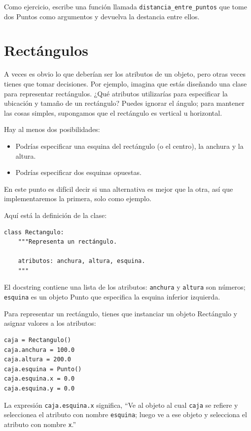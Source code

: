 \documentclass[10pt]{book}
\begin{document}
Como ejercicio, escribe una función llamada \verb"distancia_entre_puntos"
que tome dos Puntos como argumentos y devuelva la destancia entre
ellos.


\section{Rectángulos}
\label{rectangles}

A veces es obvio lo que deberían ser los atributos de un objeto,
pero otras veces tienes que tomar decisiones.  Por ejemplo, imagina que
estás diseñando una clase para representar rectángulos. ¿Qué atributos
utilizarías para especificar la ubicación y tamaño de un rectángulo?  Puedes
ignorar el ángulo; para mantener las cosas simples, supongamos que el rectángulo es
vertical u horizontal.

Hay al menos dos posibilidades:

\begin{itemize}

\item Podrías especificar una esquina del rectángulo
(o el centro), la anchura y la altura.

\item Podrías especificar dos esquinas opuestas.

\end{itemize}

En este punto es difícil decir si una alternativa es mejor que
la otra, así que implementaremos la primera, solo como ejemplo.

Aquí está la definición de la clase:

\begin{verbatim}
class Rectangulo:
    """Representa un rectángulo.

    atributos: anchura, altura, esquina.
    """
\end{verbatim}
%
El docstring contiene una lista de los atributos:  {\tt anchura} y
{\tt altura} son números; {\tt esquina} es un objeto Punto que
especifica la esquina inferior izquierda.

Para representar un rectángulo, tienes que instanciar un objeto Rectángulo
y asignar valores a los atributos:

\begin{verbatim}
caja = Rectangulo()
caja.anchura = 100.0
caja.altura = 200.0
caja.esquina = Punto()
caja.esquina.x = 0.0
caja.esquina.y = 0.0
\end{verbatim}
%
La expresión {\tt caja.esquina.x} significa,
``Ve al objeto al cual {\tt caja} se refiere y seleccionea el atributo con nombre
{\tt esquina}; luego ve a ese objeto y selecciona el atributo con nombre
{\tt x}.''
\end{document}
